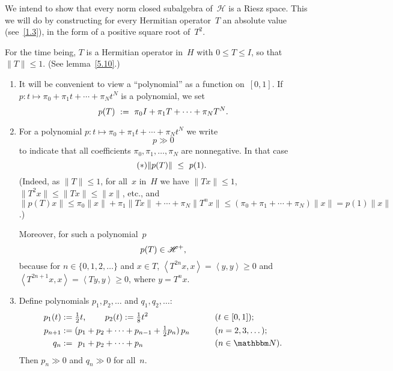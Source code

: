 \documentclass[main.tex]{subfiles}
\begin{document}
\noindent We intend to show that
every norm closed subalgebra of~$\mathscr H$
is a Riesz space.
This we will do by constructing
for every Hermitian operator~$T$
an absolute value (see~\ref{1.3}),
in the form of a positive square root of~$T^2$.
%
%
\begin{psec}{5.18}%
For the time being,
$T$ is a Hermitian operator in~$H$ with $0\leq T\leq I$,
so that $\| T\|\leq 1$.
(See lemma~\ref{5.10}.)
\begin{enumerate}
\item \label{5.18-1}
It will be convenient to view a ``polynomial'' 
as a function on~$[0,1]$.
If $p\colon t\mapsto \pi_0 + \pi_1 t + \dotsb + \pi_N t^N$
is a polynomial, we set
\begin{equation*}
p(T)\ :=\ \pi_0 I + \pi_1 T + \dotsb + \pi_N T^N\text{.}
\end{equation*}
%
\item \label{5.18-2}
For a polynomial $p\colon t\mapsto \pi_0 + \pi_1 t +\dotsb + \pi_N t^N$
we write
\begin{equation*}
p \gg 0
\end{equation*}
to indicate that all coefficients $\pi_0,\pi_1,\dotsc,\pi_N$
are nonnegative.
In that case
\begin{equation}
\tag{$*$}\label{eq5.18-2}
\|p(T)\| \ \leq \ p(1)\text{.}
\end{equation}
(Indeed,
as $\|T\|\leq 1$, for all~$x$ in~$H$
we have $\|Tx\|\leq 1$,
$\|T^2 x\|\leq \|T x\|\leq \| x\|$,
etc., and $\|p(T)x\|\leq \pi_0 \|x\|+\pi_1 \|Tx\| + \dotsb +\pi_N\|T^n x\|
\leq (\pi_0+\pi_1+\dotsb + \pi_N) \|x \|= p(1)\|x\|$.)

Moreover,
for such a polynomial~$p$
\begin{equation*}
p(T)\in\mathscr{H}^+\text{,}
\end{equation*}
because for $n\in\{0,1,2,\dotsc\}$
and $x\in T$,
$\left< T^{2n}x,x\right>=\left<y,y\right>\geq 0$
and $\left< T^{2n+1} x,x\right>=\left< Ty,y\right>\geq 0$,
where $y=T^n x$.
%
\item \label{1.18-3}
Define polynomials $p_1,p_2,\dotsc$ and $q_1,q_2,\dotsc$:
\begin{alignat*}{2}
 p_1(t)&:={\textstyle\frac{1}{2} t\htam{, }\qquad
 p_2(t):=\frac{1}{8}} t^2\qquad &&(t\in[0,1])\htam{;}\\
p_{n+1}&:=(p_1+p_2+\dotsb+p_{n-1}+{\textstyle\frac{1}{2}}p_n)\, p_n
\qquad&&(n=2,3,\dotsc)\htam{;}\\
    q_n&:=\phantom{(}p_1+p_2+\dotsb+p_n\qquad&&(n\in \N)\htam{.}
\end{alignat*}
Then $p_n\gg 0$ and $q_n\gg 0$ for all~$n$.


\end{enumerate}
\end{psec}
\end{document}
